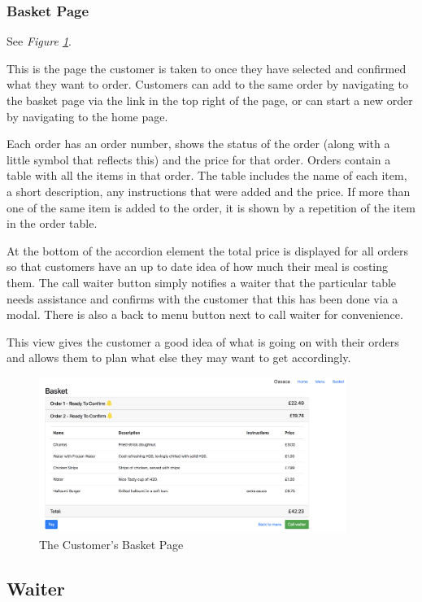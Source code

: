 \documentclass[12pt, twoside, a4paper]{report}
\begin{document}
\subsubsection*{Basket Page} 

See \textit{Figure \ref{fig:basket}}.

This is the page the customer is taken to once they have selected and confirmed what they want to order. Customers can add to the same order by navigating to the basket page via the link in the top right of the page, or can start a new order by navigating to the home page.

Each order has an order number, shows the status of the order (along with a little symbol that reflects this) and the price for that order. Orders contain a table with all the items in that order. The table includes the name of each item, a short description, any instructions that were added and the price. If more than one of the same item is added to the order, it is shown by a repetition of the item in the order table.

At the bottom of the accordion element the total price is displayed for all orders so that customers have an up to date idea of how much their meal is costing them. The call waiter button simply notifies a waiter that the particular table needs assistance and confirms with the customer that this has been done via a modal. There is also a back to menu button next to call waiter for convenience.

This view gives the customer a good idea of what is going on with their orders and allows them to plan what else they may want to get accordingly.

\begin{figure}[H]
  \centering
  \includegraphics[width=10cm]{basket.png}
  \caption{The Customer's Basket Page}
  \label{fig:basket}
\end{figure}

\subsection*{Waiter}
\end{document}
